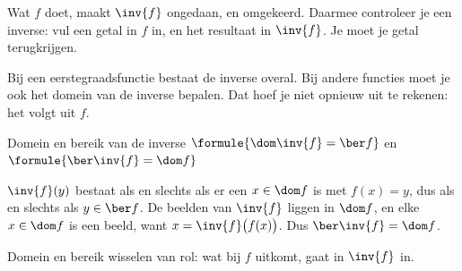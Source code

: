 Wat $f$ doet, maakt $\inv{f}$ ongedaan, en omgekeerd. Daarmee controleer je een inverse: vul een getal in $f$ in, en het resultaat in $\inv{f}$. Je moet je getal terugkrijgen.


\begin{oefeningen}
\end{oefeningen}

Bij een eerstegraadsfunctie bestaat de inverse overal. Bij andere functies moet je ook het domein van de inverse bepalen. Dat hoef je niet opnieuw uit te rekenen: het volgt uit $f$.

\begin{theorie}
\begin{stelling}{Domein en bereik van de inverse}
\qquad $\formule{\dom \inv{f} = \ber f}$ \qquad en \qquad $\formule{\ber \inv{f} = \dom f}$
\end{stelling}

\begin{bewijs}
$\inv{f}(y)$ bestaat als en slechts als er een $x \in \dom f$ is met $f(x) = y$, dus als en slechts als $y \in \ber f$. De beelden van $\inv{f}$ liggen in $\dom f$, en elke $x \in \dom f$ is een beeld, want $x = \inv{f}\bigl(f(x)\bigr)$. Dus $\ber \inv{f} = \dom f$.
\end{bewijs}
\end{theorie}

Domein en bereik wisselen van rol: wat bij $f$ uitkomt, gaat in $\inv{f}$ in.


